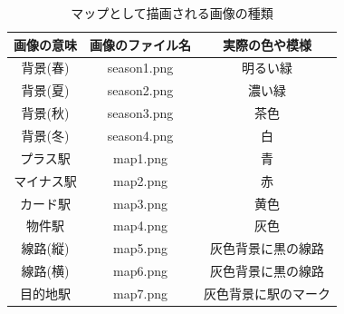 \documentclass[a4j]{jarticle}
\begin{document}
\begin{table}[H]
  \caption{マップとして描画される画像の種類}
\label{mapimage}
\begin{center}
    \begin{tabular}{c|c|c}\hline
        画像の意味 & 画像のファイル名 & 実際の色や模様 \\ \hline \hline
        背景(春) & season1.png & 明るい緑 \\ 
        背景(夏) & season2.png & 濃い緑 \\
        背景(秋) & season3.png & 茶色 \\
        背景(冬) & season4.png & 白 \\
        プラス駅 & map1.png & 青 \\
        マイナス駅 & map2.png & 赤 \\
        カード駅 & map3.png & 黄色 \\
        物件駅 & map4.png & 灰色 \\ 
        線路(縦) & map5.png & 灰色背景に黒の線路 \\ 
        線路(横) & map6.png & 灰色背景に黒の線路 \\ 
        目的地駅 & map7.png & 灰色背景に駅のマーク\\ \hline
    \end{tabular}
\end{center}
\end{table}
\end{document}
